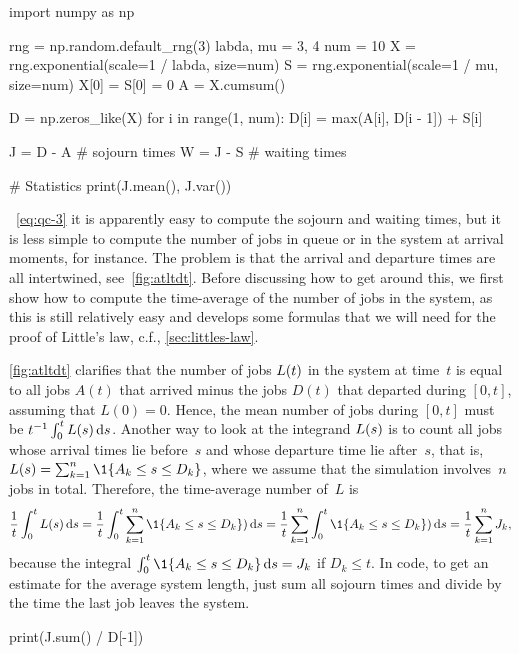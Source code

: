 \documentclass[queueing-book.tex]{subfiles}
\begin{document}
\begin{python}
import numpy as np

rng = np.random.default_rng(3)
labda, mu = 3, 4
num = 10
X = rng.exponential(scale=1 / labda, size=num)
S = rng.exponential(scale=1 / mu, size=num)
X[0] = S[0] = 0
A = X.cumsum()

D = np.zeros_like(X)
for i in range(1, num):
    D[i] = max(A[i], D[i - 1]) + S[i]

J = D - A  # sojourn times
W = J - S  # waiting times

# Statistics
print(J.mean(), J.var())
\end{python}

~\cref{eq:qc-3} it is apparently easy to compute the sojourn and waiting times, but it is less simple to compute the number of jobs in queue or in the system at arrival moments, for instance.
The problem is that the arrival and departure times are all intertwined, see~\cref{fig:atltdt}.
Before discussing how to get around this, we first show how to compute the time-average of the number of jobs in the system, as this is still relatively easy and develops some formulas that we will need for the proof of Little's law, c.f., \cref{sec:littles-law}.

\cref{fig:atltdt} clarifies that the number of jobs $L(t)$ in the system at time~$t$ is equal to all jobs $A(t)$ that arrived minus the jobs $D(t)$ that departed during $[0,t]$, assuming that $L(0)= 0$.
Hence, the mean number of jobs during $[0,t]$ must be $t^{-1}\int_0^t L(s) \,\textrm{d}s$.
Another way to look at the integrand $L(s)$ is to count all jobs whose arrival times lie before~$s$ and whose departure time lie after~$s$, that is, $\L(s) = \sum_{k=1}^{n} \1{A_k\leq s \leq D_{k}}$, where we assume that the simulation involves~$n$ jobs in total. Therefore, the time-average number of~$L$ is
\begin{align*}
  \frac{1}{t}\int_{0}^{t} L(s) \d s =
  \frac{1}{t}\int_{0}^{t} \sum_{k=1}^n \1{A_k\leq s \leq D_{k}}) \d s =
  \frac{1}{t} \sum_{k=1}^n \int_{0}^{t}\1{A_k\leq s \leq D_{k}}) \d s =
  \frac{1}{t} \sum_{k=1}^n J_{k},
\end{align*}
because the integral $\int_{0}^{t} \1{A_k\leq s \leq D_k} \d s = J_{k}$ if $D_k \leq t$.
In code, to get an estimate for the average system length, just sum all sojourn times and divide by the time the last job leaves the system.

\begin{python}
print(J.sum() / D[-1])
\end{python}
\end{document}
